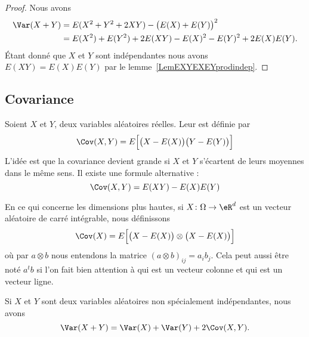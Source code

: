 \begin{proof}
	Nous avons
	\begin{subequations}
		\begin{align}
			\Var(X+Y) & =E(X^2+Y^2+2XY)-\big( E(X)+E(Y) \big)^2        \\
			          & =E(X^2)+E(Y^2)+2E(XY)-E(X)^2-E(Y)^2+2E(X)E(Y).
		\end{align}
	\end{subequations}
	Étant donné que \( X\) et \( Y\) sont indépendantes nous avons \( E(XY)=E(X)E(Y)\) par le lemme~\ref{LemEXYEXEYprodindep}.
\end{proof}


\subsection{Covariance}

Soient \( X\) et \( Y\), deux variables aléatoires réelles. Leur  est définie par
\begin{equation}    \label{EqHUWtttN}
	\Cov(X,Y)=E\Big[ \big( X-E(X) \big)\big( Y-E(Y) \big) \Big]
\end{equation}
L'idée est que la covariance devient grande si \( X\) et \( Y\) s'écartent de leurs moyennes dans le même sens. Il existe une formule alternative :
\begin{equation}
	\Cov(X,Y)=E(XY)-E(X)E(Y)
\end{equation}

En ce qui concerne les dimensions plus hautes, si \( X\colon \Omega\to \eR^d\) est un vecteur aléatoire de carré intégrable, nous définissons
\begin{equation}    \label{EqZlvLWx}
	\Cov(X)=E\Big[ \big(  X-E(X) \big)\otimes\big( X-E(X)\big) \Big]
\end{equation}
où par \( a\otimes b\) nous entendons la matrice \( (a\otimes b)_{ij}=a_ib_j\). Cela peut aussi être noté \( a^tb\) si l'on fait bien attention à qui est un vecteur colonne et qui est un vecteur ligne.

\begin{proposition}     \label{PropoVarXpYCov}
	Si \( X\) et \( Y\) sont deux variables aléatoires non spécialement indépendantes, nous avons
	\begin{equation}
		\Var(X+Y)=\Var(X)+\Var(Y)+2\Cov(X,Y).
	\end{equation}
\end{proposition}

